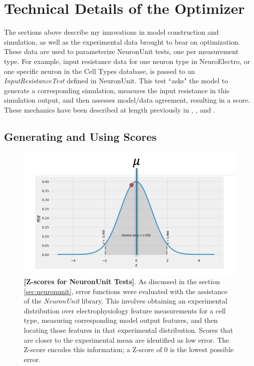 \section{Technical Details of the Optimizer}
\label{sec:tech-details}
The sections above describe my innovations in model construction and simulation, as well as the experimental data brought to bear on optimization. These data are used to parameterize NeuronUnit tests, one per measurement type.
For example, input resistance data for one neuron type in NeuroElectro, or one specific neuron in the Cell Types database, is passed to an \textit{InputResistanceTest} defined in NeuronUnit.
This test ``asks" the model to generate a corresponding simulation, measures the input resistance in this simulation output, and then assesses model/data agreement, resulting in a score.
These mechanics have been described at length previously in \cite{omar2014collaborative}, \cite{gerkin_neuronunit}, and \cite{birgiolas2019towards}.

\subsection{Generating and Using Scores}
\begin{figure}
\begin{center}
    \includegraphics{figures/normal_distribution}
    \caption[Z-scores for NeuronUnit Tests]{\textbf{[Z-scores for NeuronUnit Tests]}. As discussed in the section \ref{sec:neuronunit}, error functions were evaluated with the assistance of the \emph{NeuronUnit} library.
    This involves obtaining an experimental distribution over electrophysiology feature measurements for a cell type, measuring corresponding model output features, and then locating those features in that experimental distribution. 
    Scores that are closer to the experimental mean are identified as low error.
	The Z-score encodes this information; a Z-score of 0 is the lowest possible error.}
	\label{fig:normal-dist}
\end{center}
	
\end{figure}

